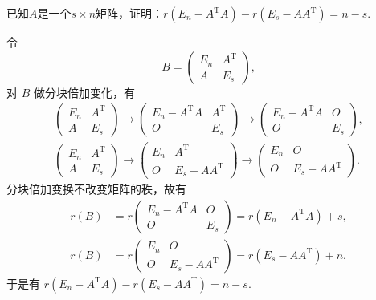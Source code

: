 \begin{exercise}
\begin{exgroup}
        \item 已知$A$是一个$s \times n$矩阵，证明：$r(E_n-A^\mathrm{T}A)-r(E_s-AA^\mathrm{T})=n-s$.
        \begin{answer}
            令
            \[
                B = \begin{pmatrix}
                    E_n & A^\mathrm{T} \\
                    A   & E_s
                \end{pmatrix},
            \]
            对 $B$ 做分块倍加变化，有
            \begin{gather*}
                \begin{pmatrix}
                    E_n & A^\mathrm{T} \\
                    A   & E_s
                \end{pmatrix} \to \begin{pmatrix}
                    E_n - A^\mathrm{T}A & A^\mathrm{T} \\
                    O                   & E_s
                \end{pmatrix} \to \begin{pmatrix}
                    E_n - A^\mathrm{T}A & O   \\
                    O                   & E_s
                \end{pmatrix}, \\
                \begin{pmatrix}
                    E_n & A^\mathrm{T} \\
                    A   & E_s
                \end{pmatrix} \to \begin{pmatrix}
                    E_n & A^\mathrm{T}        \\
                    O   & E_s - AA^\mathrm{T}
                \end{pmatrix} \to \begin{pmatrix}
                    E_n & O                   \\
                    O   & E_s - AA^\mathrm{T}
                \end{pmatrix}.
            \end{gather*}
            分块倍加变换不改变矩阵的秩，故有
            \begin{align*}
                r(B) &= r\begin{pmatrix}
                    E_n - A^\mathrm{T}A & O   \\
                    O                   & E_s
                \end{pmatrix} = r(E_n - A^\mathrm{T}A) + s, \\
                r(B) &= r\begin{pmatrix}
                    E_n & O                   \\
                    O   & E_s - AA^\mathrm{T}
                \end{pmatrix} = r(E_s - AA^\mathrm{T}) + n.
            \end{align*}
            于是有 $r(E_n-A^\mathrm{T}A)-r(E_s-AA^\mathrm{T})=n-s$.
        \end{answer}


\end{exgroup}
\end{exercise}
